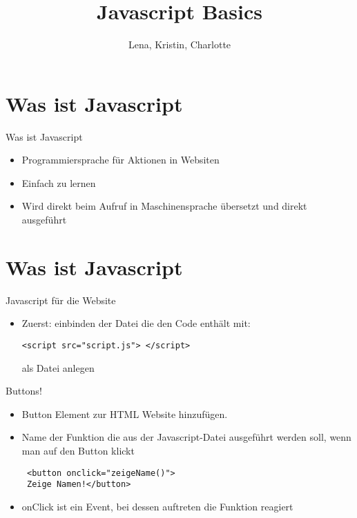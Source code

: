 \documentclass[18pt]{beamer}
\title[Javascript Basics]{Javascript Basics}
\author{Lena, Kristin, Charlotte}
\begin{document}

\begin{frame}
\titlepage
\end{frame}

\section {Was ist Javascript}
\begin{frame}{Was ist Javascript}
\begin {itemize}
\item Programmiersprache für Aktionen in Websiten
\item Einfach zu lernen 
\item Wird direkt beim Aufruf in Maschinensprache übersetzt und direkt ausgeführt
\end {itemize}
\end{frame}

\section {Was ist Javascript}
\begin{frame}[fragile]{Javascript für die Website}
\begin {itemize}
\item Zuerst:  einbinden der Datei die den Code enthält mit:
\begin{lstlisting}
<script src="script.js"> </script>
\end{lstlisting}
 als Datei anlegen
\end {itemize}
\end{frame}


\begin{frame}[fragile]{Buttons!}
\begin {itemize}
\item Button Element zur HTML Website hinzufügen. 
\item Name der Funktion die aus der Javascript-Datei ausgeführt werden soll, wenn man auf den Button klickt
\begin{lstlisting}
 <button onclick="zeigeName()">
 Zeige Namen!</button>
\end{lstlisting}
\item onClick ist ein Event, bei dessen auftreten die Funktion reagiert
\end {itemize}
\end{frame}
\end{document}
